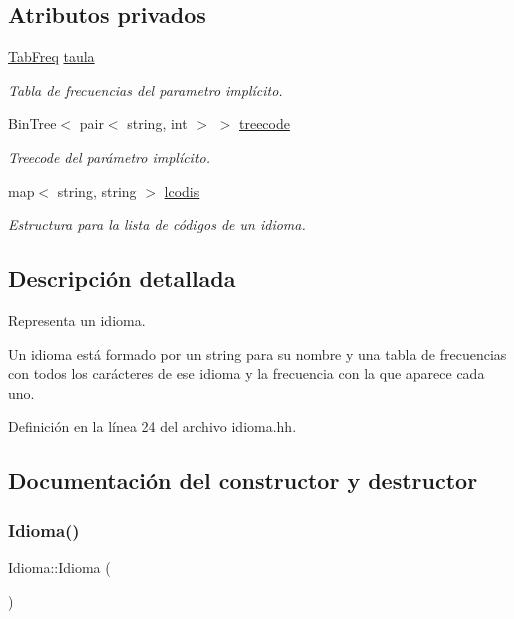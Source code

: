 \subsection*{Atributos privados}
\begin{DoxyCompactItemize}
\item 
\hyperlink{class_tab_freq}{Tab\+Freq} \hyperlink{class_idioma_a5e144ffaa4c1c63690e08e4e2687a13f}{taula}
\begin{DoxyCompactList}\small\item\em Tabla de frecuencias del parametro implícito. \end{DoxyCompactList}\item 
Bin\+Tree$<$ pair$<$ string, int $>$ $>$ \hyperlink{class_idioma_a5eeaf73b2498503c5c686ac259e1f675}{treecode}
\begin{DoxyCompactList}\small\item\em Treecode del parámetro implícito. \end{DoxyCompactList}\item 
map$<$ string, string $>$ \hyperlink{class_idioma_ab908f7375f4506b26dd3cd163bc0b8cd}{lcodis}
\begin{DoxyCompactList}\small\item\em Estructura para la lista de códigos de un idioma. \end{DoxyCompactList}\end{DoxyCompactItemize}


\subsection{Descripción detallada}
Representa un idioma. 

Un idioma está formado por un string para su nombre y una tabla de frecuencias con todos los carácteres de ese idioma y la frecuencia con la que aparece cada uno. 

Definición en la línea 24 del archivo idioma.\+hh.



\subsection{Documentación del constructor y destructor}
\mbox{\label{class_idioma_a6722a621ce03825772493e67e5a17215}} 
\subsubsection{\texorpdfstring{Idioma()}{Idioma()}}
{\footnotesize\ttfamily Idioma\+::\+Idioma (\begin{DoxyParamCaption}{ }\end{DoxyParamCaption})}



